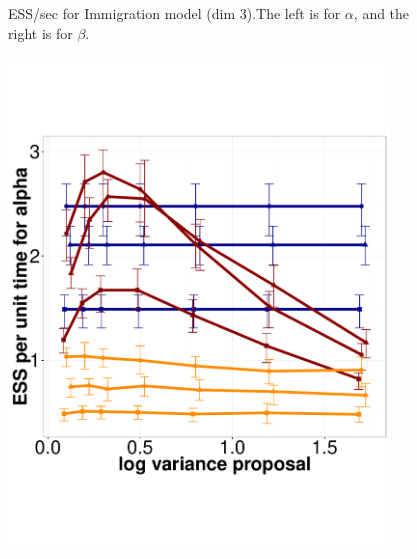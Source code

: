 \begin{figure}
\begin{minipage}[hp]{0.45\linewidth}
    \vspace{-0 in}
     \label{fig:ESS_Q_D3}
  \end{minipage}
    \caption{ESS/sec for Immigration model (dim 3).The left is for $\alpha$, and the right is for $\beta$.}
  \end{figure}

  \begin{figure}%
  \centering
  \begin{minipage}[hp]{0.45\linewidth}
  \centering
    \includegraphics [width=0.90\textwidth, angle=0]{figs/q_5_alpha.pdf}
      \end{minipage}
  \begin{minipage}[hp]{0.45\linewidth}
  \centering

\end{minipage}
\end{figure}
